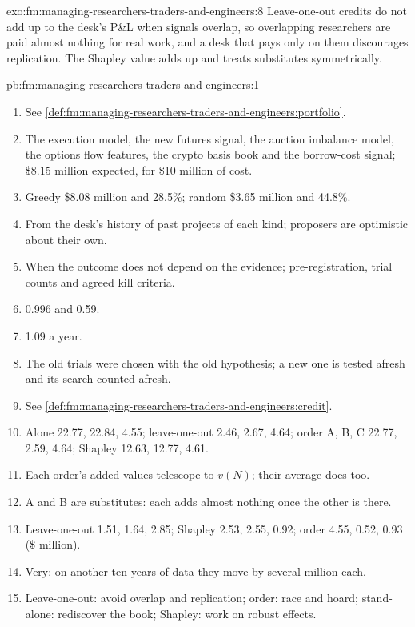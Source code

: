 \begin{solution}{exo:fm:managing-researchers-traders-and-engineers:8}
Leave-one-out credits do not add up to the desk's P\&L when signals overlap, so overlapping researchers are paid almost nothing for real
work, and a desk that pays only on them discourages replication. The Shapley value adds up and treats substitutes symmetrically.
\end{solution}

\begin{solution}{pb:fm:managing-researchers-traders-and-engineers:1}
\begin{enumerate}
\item See \cref{def:fm:managing-researchers-traders-and-engineers:portfolio}.
\item The execution model, the new futures signal, the auction imbalance model, the options flow features, the crypto basis book and the
borrow-cost signal; \$8.15 million expected, for \$10 million of cost.
\item Greedy \$8.08 million and 28.5\%; random \$3.65 million and 44.8\%.
\item From the desk's history of past projects of each kind; proposers are optimistic about their own.
\item When the outcome does not depend on the evidence; pre-registration, trial counts and agreed kill criteria.
\item 0.996 and 0.59.
\item 1.09 a year.
\item The old trials were chosen with the old hypothesis; a new one is tested afresh and its search counted afresh.
\item See \cref{def:fm:managing-researchers-traders-and-engineers:credit}.
\item Alone 22.77, 22.84, 4.55; leave-one-out 2.46, 2.67, 4.64; order A, B, C 22.77, 2.59, 4.64; Shapley 12.63, 12.77, 4.61.
\item Each order's added values telescope to $v(N)$; their average does too.
\item A and B are substitutes: each adds almost nothing once the other is there.
\item Leave-one-out 1.51, 1.64, 2.85; Shapley 2.53, 2.55, 0.92; order 4.55, 0.52, 0.93 (\$ million).
\item Very: on another ten years of data they move by several million each.
\item Leave-one-out: avoid overlap and replication; order: race and hoard; stand-alone: rediscover the book; Shapley: work on robust effects.

\end{enumerate}
\end{solution}
